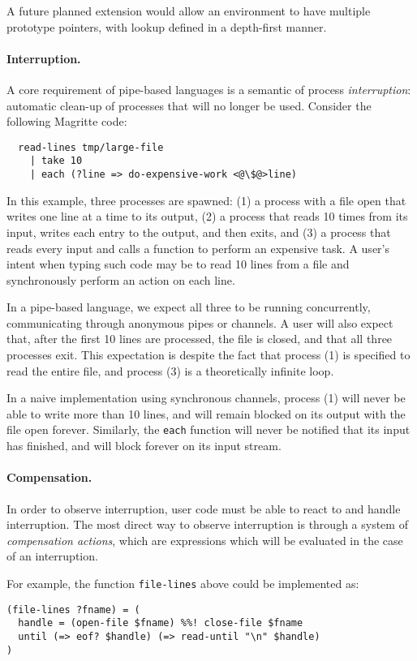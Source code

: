 \documentclass[english,preprint,JIP]{ipsj}
\begin{document}
A future planned extension would allow an environment to have multiple prototype pointers, with lookup defined in a depth-first manner.

\paragraph{Interruption.}
A core requirement of pipe-based languages is a semantic of process \emph{interruption}: automatic clean-up of processes that will no longer be used. Consider the following Magritte code:
\begin{lstlisting}
  read-lines tmp/large-file
    | take 10
    | each (?line => do-expensive-work <@\$@>line)
\end{lstlisting}

In this example, three processes are spawned: (1) a process with a file open that writes one line at a time to its output, (2) a process that reads 10 times from its input, writes each entry to the output, and then exits, and (3) a process that reads every input and calls a function to perform an expensive task.
A user's intent when typing such code may be to read 10 lines from a file and synchronously perform an action on each line.

In a pipe-based language, we expect all three to be running concurrently, communicating through anonymous pipes or channels.
A user will also expect that, after the first 10 lines are processed, the file is closed, and that all three processes exit.
This expectation is despite the fact that process (1) is specified to read the entire file, and process (3) is a theoretically infinite loop.

In a naive implementation using synchronous channels, process (1) will never be able to write more than 10 lines, and will remain blocked on its output with the file open forever.
Similarly, the \verb/each/ function will never be notified that its input has finished, and will block forever on its input stream.

\paragraph{Compensation.} In order to observe interruption, user code must be able to react to and handle interruption. The most direct way to observe interruption is through a system of \emph{compensation actions}, which are expressions which will be evaluated in the case of an interruption.

For example, the function \verb/file-lines/ above could be implemented as:
\begin{lstlisting}
(file-lines ?fname) = (
  handle = (open-file $fname) %%! close-file $fname
  until (=> eof? $handle) (=> read-until "\n" $handle)
)
\end{lstlisting}
\end{document}
